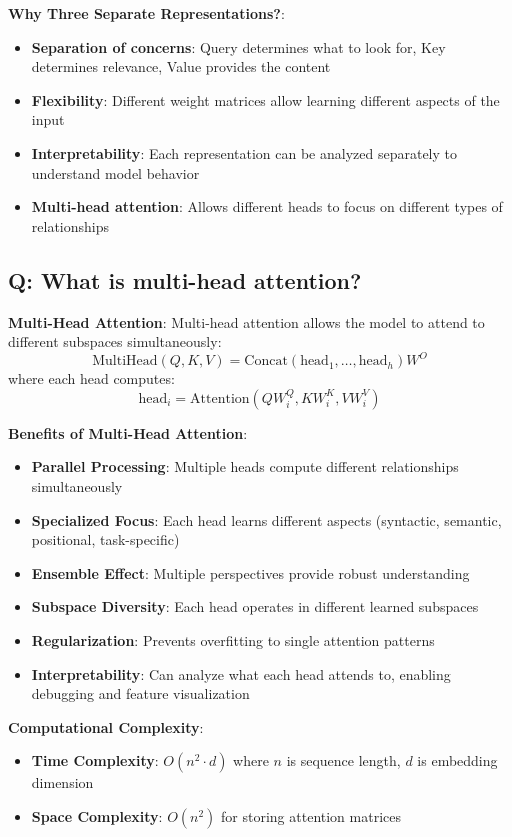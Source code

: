 \textbf{Why Three Separate Representations?}:
\begin{itemize}
	\item \textbf{Separation of concerns}: Query determines what to look for, Key determines relevance, Value provides the content
	\item \textbf{Flexibility}: Different weight matrices allow learning different aspects of the input
	\item \textbf{Interpretability}: Each representation can be analyzed separately to understand model behavior
	\item \textbf{Multi-head attention}: Allows different heads to focus on different types of relationships
\end{itemize}

\subsection*{Q: What is multi-head attention?}

\textbf{Multi-Head Attention}:
Multi-head attention allows the model to attend to different subspaces simultaneously:
\[
	\text{MultiHead}(Q, K, V) = \text{Concat}(\text{head}_1, \ldots, \text{head}_h)W^O
\]
where each head computes:
\[
	\text{head}_i = \text{Attention}(QW_i^Q, KW_i^K, VW_i^V)
\]

\textbf{Benefits of Multi-Head Attention}:
\begin{itemize}
	\item \textbf{Parallel Processing}: Multiple heads compute different relationships simultaneously
	\item \textbf{Specialized Focus}: Each head learns different aspects (syntactic, semantic, positional, task-specific)
	\item \textbf{Ensemble Effect}: Multiple perspectives provide robust understanding
	\item \textbf{Subspace Diversity}: Each head operates in different learned subspaces
	\item \textbf{Regularization}: Prevents overfitting to single attention patterns
	\item \textbf{Interpretability}: Can analyze what each head attends to, enabling debugging and feature visualization
\end{itemize}

\textbf{Computational Complexity}:
\begin{itemize}
	\item \textbf{Time Complexity}: \(O(n^2 \cdot d)\) where \(n\) is sequence length, \(d\) is embedding dimension
	\item \textbf{Space Complexity}: \(O(n^2)\) for storing attention matrices
\end{itemize}

